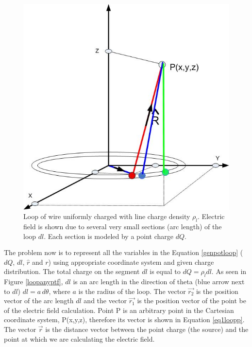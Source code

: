 \documentclass{ximera}
\begin{document}
\begin{figure}[htbp]
\begin{center}
\includegraphics[scale=0.4]{../jpg/ringefieldanywheremorechargespot.jpg}
\end{center}
\caption{Loop of wire uniformly charged with line charge density $\rho_l$. Electric field is shown due to several very small sections (arc length) of the loop $dl$.
Each section is modeled by a point charge $dQ$.}
\label{loopanypt1}
\end{figure}



The problem now  is to represent all the variables in the Equation \ref{genpotloop}  ( $dQ$, $dl$, $\hat{r}$ and $r$) using  appropriate coordinate system and given charge distribution.
The  total charge on the segment $dl$ is equal to $dQ=\rho_l dl$. As seen in Figure \ref{loopanyptf}, $dl$ is an arc length in the direction of theta (blue arrow next to $dl$) $dl=a\, d\theta$, where $ a$ is the radius of the loop. The vector $\vec{r_2}$ is the position vector of the arc length $dl$ and the vector $\vec{r_1}$  is the position vector of the point be  of the electric field calculation. Point P is an arbitrary point in the Cartesian coordinate system, P(x,y,z), therefore its  vector is shown in Equation \ref{eq1loopp}.  The vector $\vec{r}$ is the distance vector between the point charge (the source) and the point at which we are calculating the electric field. 
\end{document}

